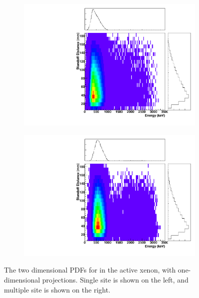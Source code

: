 \documentclass[herrin-thesis.tex]{subfiles}
\begin{document}
\begin{figure}[hp]
\centering
	\begin{subfigure}[b]{0.48\textwidth}
	\centering
	\includegraphics[width=\textwidth]{./plots/PDFs/analysis_pdf_ActiveLXe_Rn222_ss.pdf}
\end{subfigure}\hfill%
\begin{subfigure}[b]{0.48\textwidth}
	\centering
	\includegraphics[width=1\textwidth]{./plots/PDFs/analysis_pdf_ActiveLXe_Rn222_ms.pdf}
	\end{subfigure}
\caption[PDF for  in the active xenon]{The two dimensional PDFs for  in the active xenon, with one-dimensional projections. Single site is shown on the left, and multiple site is shown on the right.}
\label{fig:analysis_pdf_ActiveLXe_Rn222}
\end{figure}
\end{document}

